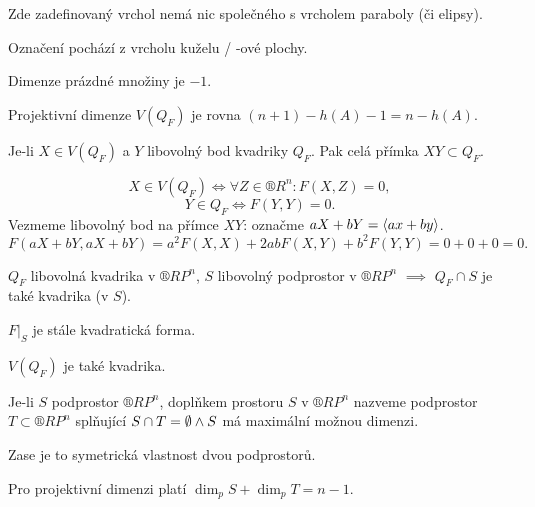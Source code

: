 \documentclass[12pt]{article}					%
\begin{document}
\begin{upozorneni}
	Zde zadefinovaný vrchol nemá nic společného s vrcholem paraboly (či elipsy).

	\begin{poznamkain}
		Označení pochází z vrcholu kuželu / -ové plochy.
	\end{poznamkain}
\end{upozorneni}

\begin{poznamka}[Definice]
	Dimenze prázdné množiny je $-1$.
\end{poznamka}

\begin{tvrzeni}
	Projektivní dimenze $V(Q_F)$ je rovna $(n+1) - h(A) - 1 = n - h(A)$.
\end{tvrzeni}

\begin{tvrzeni}
	Je-li $X \in V(Q_F)$ a $Y$ libovolný bod kvadriky $Q_F$. Pak celá přímka $XY \subset Q_F$.

	\begin{dukazin}
		$$ X \in V(Q_F) \Leftrightarrow \forall Z \in ®R^n: F(X, Z) = 0, $$
		$$ Y \in Q_F \Leftrightarrow F(Y, Y) = 0. $$
		Vezmeme libovolný bod na přímce $XY$: označme $aX + bY = \left\langle ax + by\right\rangle$.
		$$ F(aX + bY, aX + bY) = a^2 F(X, X) + 2ab F(X, Y) + b^2 F(Y, Y) = 0 + 0 + 0 = 0. $$
	\end{dukazin}
\end{tvrzeni}

\begin{tvrzeni}
	$Q_F$ libovolná kvadrika v $®RP^n$, $S$ libovolný podprostor v $®RP^n$ $\implies$ $Q_F \cap S$ je také kvadrika (v $S$).

	\begin{dukazin}
		$F|_S$ je stále kvadratická forma.
	\end{dukazin}
\end{tvrzeni}

\begin{dusledek}
	$V(Q_F)$ je také kvadrika.
\end{dusledek}

\begin{definice}[Doplněk]
	Je-li $S$ podprostor $®RP^n$, doplňkem prostoru $S$ v $®RP^n$ nazveme podprostor $T \subset ®RP^n$ splňující $S \cap T = \emptyset \land S$ má maximální možnou dimenzi.

	\begin{poznamkain}
		Zase je to symetrická vlastnost dvou podprostorů.

		Pro projektivní dimenzi platí $\dim_p S + \dim_p T = n - 1$.
	\end{poznamkain}
\end{definice}
\end{document}
